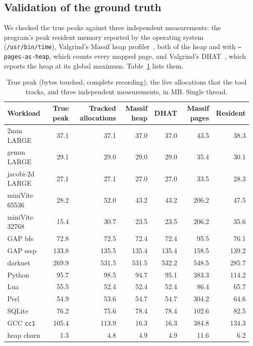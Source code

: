 \documentclass[11pt]{article}
\newcommand{\tabref}[1]{Table~\ref{#1}}
\begin{document}
\subsection{Validation of the ground truth}
\label{sec:validation}

We checked the true peaks against three independent measurements: the program's peak resident memory reported by the operating system (\texttt{/usr/bin/time}), Valgrind's Massif heap profiler~\cite{ValgrindMassif}, both of the heap and with \texttt{--pages-as-heap}, which counts every mapped page, and Valgrind's DHAT~\cite{dhat}, which reports the heap at its global maximum. \tabref{tab:validation} lists them.

\begin{table}[t]
\centering
\small
\caption{True peak (bytes touched, complete recording), the live allocations that the tool tracks, and three independent measurements, in MB. Single thread.}
\label{tab:validation}
\begin{tabular}{lrrrrrr}
\toprule
Workload & True peak & Tracked allocations & Massif heap & DHAT & Massif pages & Resident \\
\midrule
2mm LARGE & 37.1 & 37.1 & 37.0 & 37.0 & 43.5 & 38.3 \\
gemm LARGE & 29.1 & 29.0 & 29.0 & 29.0 & 35.4 & 30.1 \\
jacobi-2d LARGE & 27.1 & 27.1 & 27.0 & 27.0 & 33.5 & 28.3 \\
miniVite 65536 & 28.2 & 52.0 & 43.2 & 43.2 & 206.2 & 47.5 \\
miniVite 32768 & 15.4 & 30.7 & 23.5 & 23.5 & 206.2 & 35.6 \\
GAP bfs & 72.8 & 72.5 & 72.4 & 72.4 & 95.5 & 76.1 \\
GAP sssp & 133.8 & 135.5 & 135.4 & 135.4 & 158.5 & 139.2 \\
darknet & 269.9 & 531.5 & 531.5 & 532.2 & 548.5 & 285.7 \\
Python & 95.7 & 98.5 & 94.7 & 95.1 & 383.3 & 114.2 \\
Lua & 55.5 & 52.4 & 52.4 & 52.4 & 86.4 & 65.7 \\
Perl & 54.9 & 53.6 & 54.7 & 54.7 & 304.2 & 64.6 \\
SQLite & 76.2 & 75.6 & 78.4 & 78.4 & 102.6 & 82.5 \\
GCC \texttt{cc1} & 105.4 & 113.9 & 16.3 & 16.3 & 384.8 & 134.3 \\
heap churn & 1.3 & 4.8 & 4.9 & 4.9 & 11.6 & 6.2 \\
\bottomrule
\end{tabular}
\end{table}
\end{document}
